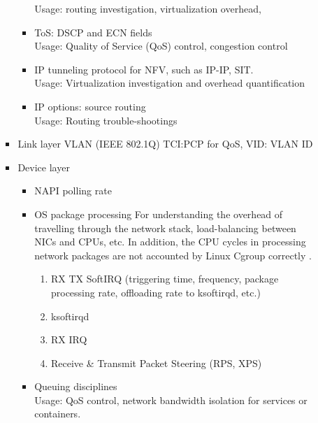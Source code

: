 \begin{itemize}
\begin{itemize}
\begin{itemize}
\begin{itemize}
            Usage: routing investigation, virtualization overhead,
        \item {ToS: DSCP and ECN fields} \\
            Usage: Quality of Service (QoS) control, congestion control \autocite{DBLP:conf/sigcomm/AlizadehGMPPPSS10}
        \item IP tunneling protocol for NFV, such as IP-IP, SIT. \\
            Usage: Virtualization investigation and overhead quantification
        \item IP options: source routing \\
            Usage: Routing trouble-shootings
        \end{itemize}
   \item Link layer
      VLAN (IEEE 802.1Q) \autocite{url/ieee802.1q} TCI:PCP for QoS, VID: VLAN ID
   \item Device layer
      \begin{itemize}
        \item NAPI polling rate
        \item OS package processing
          For understanding the overhead of travelling through the network stack, load-balancing between NICs and CPUs, etc.
          In addition, the CPU cycles in processing network packages are not accounted by Linux Cgroup correctly \autocite{DBLP:conf/nsdi/KhalidRFXRFA18}.
            \begin{enumerate}
            \item RX TX SoftIRQ (triggering time, frequency, package processing rate, offloading rate to ksoftirqd, etc.)
            \item ksoftirqd
            \item RX IRQ
            \item Receive \& Transmit Packet Steering (RPS, XPS) \autocite{DBLP:conf/sosp/MartyKAABCDDEGK19}
           \end{enumerate}
        \item Queuing disciplines \\
          Usage: QoS control, network bandwidth isolation for services or containers.
      \end{itemize}


\end{itemize}
\end{itemize}
\end{itemize}

